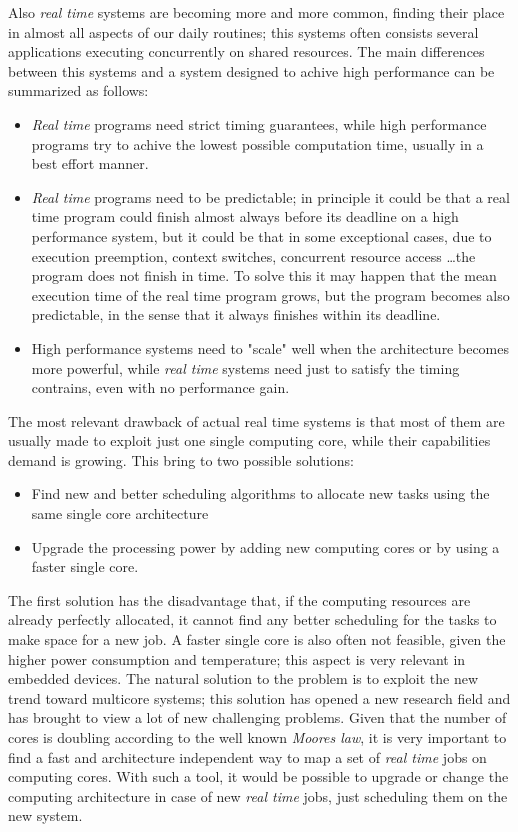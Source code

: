 \documentclass[a4paper,11pt,oneside]{book}
\begin{document}
Also \emph{real time} systems are becoming more and more common, finding their place in almost all aspects of our daily routines; this systems often consists several applications executing concurrently on shared resources. 
The main differences between this systems and a system designed to achive high performance can be summarized as follows:
\begin{itemize}
\item{ \emph{Real time} programs need strict timing guarantees, while high performance programs try to achive the lowest possible computation time, usually in a best effort manner.}
\item{\emph{Real time} programs need to be predictable; in principle it could be that a real time program could finish almost always before its deadline on a high performance system, but it could be that in some exceptional cases, due to execution preemption, context switches, concurrent resource access \dots the program does not finish in time. To solve this it may happen that the mean execution time of the real time program grows, but the program becomes also predictable, in the sense that it always finishes within its deadline.}
\item{ High performance systems need to "scale" well when the architecture becomes more powerful, while \emph{real time} systems need just to satisfy the timing contrains, even with no performance gain.  }

\end{itemize}

The most relevant drawback of actual real time systems is that most of them are usually made to exploit just one single computing core, while their capabilities demand is growing. This bring to two possible solutions:
\begin{itemize}
\item{Find new and better scheduling algorithms to allocate new tasks using the same single core architecture}
\item{Upgrade the processing power by adding new computing cores or by using a faster single core.}
\end{itemize}

The first solution has the disadvantage that, if the computing resources are already perfectly allocated, it cannot find any better scheduling for the tasks to make space for a new job. A faster single core is also often not feasible, given the higher power consumption and temperature; this aspect is very relevant in embedded devices. 
The natural solution to the problem is to exploit the new trend toward multicore systems; this solution has opened a new research field and has brought to view a lot of new challenging problems. Given that the number of cores is doubling according to the well known \emph{Moores law}, it is very important to find a fast and architecture independent way to map a set of \emph{real time} jobs on computing cores. With such a tool, it would be possible to upgrade or change the computing architecture in case of new \emph{real time} jobs, just scheduling them on the new system.\\
\end{document}
